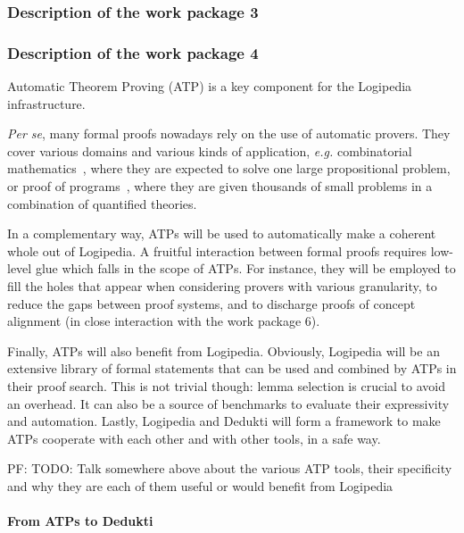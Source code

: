 \subsubsection{Description of the work package 3}

\subsubsection{Description of the work package 4}

Automatic Theorem Proving (ATP) is a key component for the Logipedia
infrastructure.

{\em Per se}, many formal proofs nowadays rely on the use of automatic
provers. They cover various domains and various kinds of application,
{\em e.g.} combinatorial
mathematics~\cite{DBLP:journals/ai/KonevL15,DBLP:conf/sat/HeuleKM16},
where they are expected to solve one large propositional problem, or
proof of
programs~\cite{DBLP:conf/esop/FilliatreP13,DBLP:journals/pacmpl/ProtzenkoZRRWBD17},
where they are given thousands of small problems in a combination of
quantified theories.

In a complementary way, ATPs will be used to automatically make a
coherent whole out of {\sf Logipedia}. A fruitful interaction between
formal proofs requires low-level glue which falls in the scope of ATPs.
For instance, they will be employed to fill the holes that appear when
considering provers with various granularity, to reduce the gaps between
proof systems, and to discharge proofs of concept alignment (in close
interaction with the work package 6).

Finally, ATPs will also benefit from {\sf Logipedia}. Obviously, {\sf
  Logipedia} will be an extensive library of formal statements that can
be used and combined by ATPs in their proof search. This is not trivial
though: lemma selection is crucial to avoid an overhead. It can also be
a source of benchmarks to evaluate their expressivity and automation.
Lastly, {\sf Logipedia} and {\sf Dedukti} will form a framework to make
ATPs cooperate with each other and with other tools, in a safe way.

PF: TODO: Talk somewhere above about the various ATP tools, their specificity and why they are each of them useful or would benefit from Logipedia

\paragraph{From ATPs to {\sf Dedukti}}

